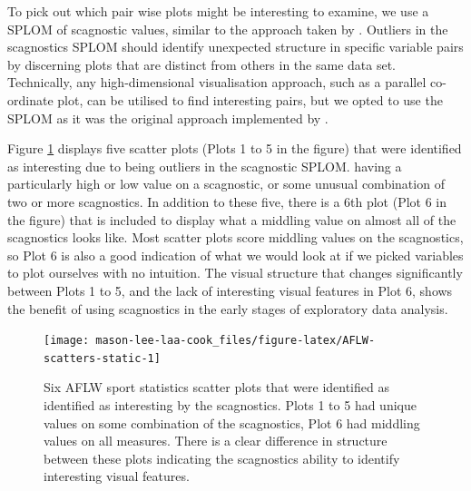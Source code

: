 To pick out which pair wise plots might be interesting to examine, we use a SPLOM of scagnostic values, similar to the approach taken by \citet{scagdist}. Outliers in the scagnostics SPLOM should identify unexpected structure in specific variable pairs by discerning plots that are distinct from others in the same data set. Technically, any high-dimensional visualisation approach, such as a parallel co-ordinate plot, can be utilised to find interesting pairs, but we opted to use the SPLOM as it was the original approach implemented by \citet{tukey1985computer}.

Figure \ref{fig:AFLW-scatters-static} displays five scatter plots (Plots 1 to 5 in the figure) that were identified as interesting due to being outliers in the scagnostic SPLOM. having a particularly high or low value on a scagnostic, or some unusual combination of two or more scagnostics. In addition to these five, there is a 6th plot (Plot 6 in the figure) that is included to display what a middling value on almost all of the scagnostics looks like. Most scatter plots score middling values on the scagnostics, so Plot 6 is also a good indication of what we would look at if we picked variables to plot ourselves with no intuition. The visual structure that changes significantly between Plots 1 to 5, and the lack of interesting visual features in Plot 6, shows the benefit of using scagnostics in the early stages of exploratory data analysis.

\begin{figure}

{\centering \texttt{[image: mason-lee-laa-cook\_files/figure-latex/AFLW-scatters-static-1]} 

}

\caption{Six AFLW sport statistics scatter plots that were identified as identified as interesting by the scagnostics. Plots 1 to 5 had unique values on some combination of the scagnostics, Plot 6 had middling values on all measures. There is a clear difference in structure between these plots indicating the scagnostics ability to identify interesting visual features.}\label{fig:AFLW-scatters-static}
\end{figure}

